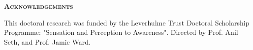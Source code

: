 \pagestyle{empty}%
\begin{center}
	\Huge \textsc{\textbf{Acknowledgements}}
	\hrulefill
\end{center}

This doctoral research was funded by the Leverhulme Trust Doctoral Scholarship Programme: "Sensation and Perception to Awareness". Directed by Prof. Anil Seth, and Prof. Jamie Ward.
